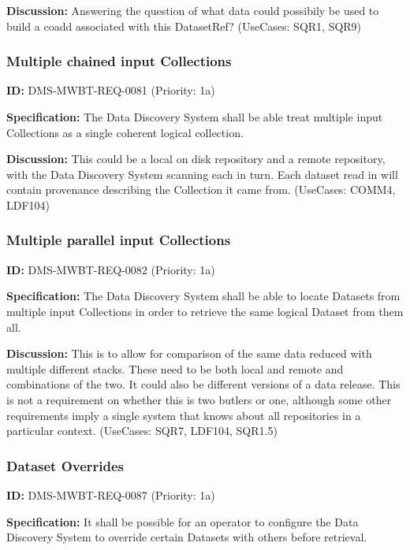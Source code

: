 \documentclass[SE,toc,lsstdraft]{lsstdoc}
\begin{document}
\textbf{Discussion:}
Answering the question of what data could possibily be used to build a coadd associated with this DatasetRef? (UseCases: SQR1, SQR9)

\subsubsection{Multiple chained input Collections}

\label{DMS-MWBT-REQ-0081}
\textbf{ID:} DMS-MWBT-REQ-0081 (Priority: 1a)

\textbf{Specification:}
The Data Discovery System shall be able treat multiple input Collections as a single coherent logical collection.

\textbf{Discussion:}
This could be a local on disk repository and a remote repository, with the Data Discovery System scanning each in turn. Each dataset read in will contain provenance describing the Collection it came from. (UseCases: COMM4, LDF104)

\subsubsection{Multiple parallel input Collections}

\label{DMS-MWBT-REQ-0082}
\textbf{ID:} DMS-MWBT-REQ-0082 (Priority: 1a)

\textbf{Specification:}
The Data Discovery System shall be able to locate Datasets from multiple input Collections in order to retrieve the same logical Dataset from them all.

\textbf{Discussion:}
This is to allow for comparison of the same data reduced with multiple different stacks. These need to be both local and remote and combinations of the two. It could also be different versions of a data release. This is not a requirement on whether this is two butlers or one, although some other requirements imply a single system that knows about all repositories in a particular context. (UseCases: SQR7, LDF104, SQR1.5)

\subsubsection{Dataset Overrides}

\label{DMS-MWBT-REQ-0087}
\textbf{ID:} DMS-MWBT-REQ-0087 (Priority: 1a)

\textbf{Specification:}
It shall be possible for an operator to configure the Data Discovery System to override certain Datasets with others before retrieval.
\end{document}
